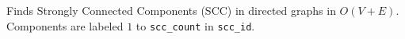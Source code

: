 
Finds Strongly Connected Components (SCC) in directed graphs in $O(V + E)$. Components are labeled $1$ to \lstinline|scc_count| in \lstinline|scc_id|.


